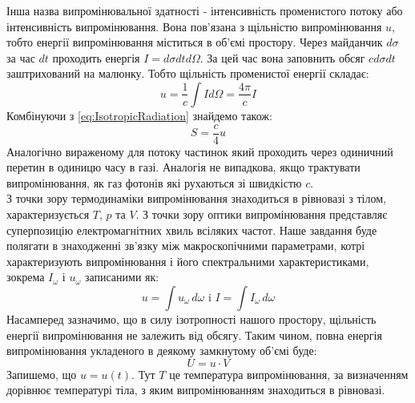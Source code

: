 \documentclass{article}
\begin{document}
Інша назва випромінювальної здатності - інтенсивність променистого потоку або інтенсивність випромінювання. Вона пов'язана з щільністю випромінювання $u$, тобто 
енергії випромінювання міститься в об'ємі простору. Через майданчик $d\sigma$ за час $dt$ проходить енергія $I = d\sigma dt d\Omega$. За цей час вона заповнить 
обсяг $c d\sigma dt$ заштрихований на малюнку. Тобто щільність променистої енергії складає:
\begin{equation}
    \label{eq:RadiantEnergyDensity}
    u = \frac{1}{c} \int I d\Omega = \frac{4\pi}{c} I
\end{equation}
Комбінуючи з \eqref{eq:IsotropicRadiation} знайдемо також:
\begin{equation}
    \label{eq:IsotropicRadiationCombined}
    S = \frac{c}{4}u
\end{equation}
Аналогічно вираженому для потоку частинок який проходить через одиничний  перетин в одиницю часу в газі. Аналогія не випадкова, якщо трактувати випромінювання, 
як газ фотонів які рухаються зі швидкістю $c$. \\
З точки зору термодинаміки випромінювання знаходиться в рівновазі з тілом, характеризується $T$, $p$ та $V$. З точки зору оптики випромінювання представляє 
суперпозицію електромагнітних хвиль всіляких частот. Наше завдання буде полягати в знаходженні зв'язку між макроскопічними параметрами, котрі характеризують 
випромінювання і його спектральними характеристиками, зокрема $I_{\omega}$ і $u_{\omega}$ записаними як:
\begin{equation}
    \label{eq:SpectralCharacteristics}
    u = \int u_{\omega} \, d\omega \text{ i } I = \int I_{\omega} \, d\omega
\end{equation}
Насамперед зазначимо, що в силу ізотропності нашого простору, щільність енергії випромінювання не залежить від обсягу. Таким чином, повна енергія 
випромінювання укладеного в деякому замкнутому об'ємі буде:
\begin{equation}
    \label{eq:TotalEnergyOfRadiation}
    U = u \cdot V
\end{equation}
Запишемо, що $u = u(t)$. Тут $T$ це температура випромінювання, за визначенням дорівнює температурі тіла, з яким випромінюванням знаходиться в рівновазі.
\end{document}
